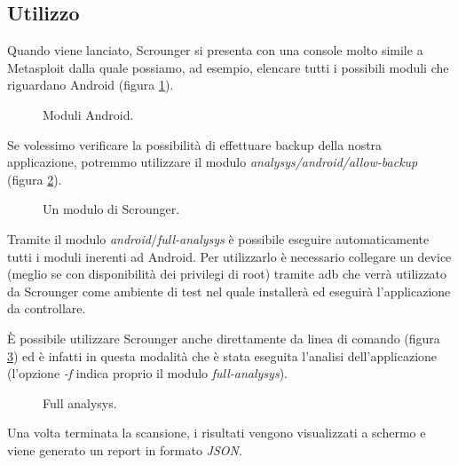 \subsection{Utilizzo}
Quando viene lanciato, Scrounger si presenta con una console molto simile a Metasploit dalla quale possiamo, ad esempio, elencare tutti i possibili moduli che riguardano Android (figura \ref{fig:lista}).
\begin{figure}[h]
	\centering 
	\caption{Moduli Android.}
	\label{fig:lista}
\end{figure}

Se volessimo verificare la possibilità di effettuare backup della nostra applicazione, potremmo utilizzare il modulo \emph{analysys/android/allow-backup} (figura \ref{fig:example}).
\begin{figure}[h]
	\centering 
	\caption{Un modulo di Scrounger.}
	\label{fig:example}
\end{figure}

Tramite il modulo \emph{android$/$full-analysys} è possibile eseguire automaticamente tutti i moduli inerenti ad Android. Per utilizzarlo è necessario collegare un device (meglio se con disponibilità dei privilegi di root) tramite adb che verrà utilizzato da Scrounger come ambiente di test nel quale installerà ed eseguirà l'applicazione da controllare.

È possibile utilizzare Scrounger anche direttamente da linea di comando (figura \ref{fig:start}) ed è infatti in questa modalità che è stata eseguita l'analisi dell'applicazione (l'opzione \emph{-f} indica proprio il modulo \emph{full-analysys}).
\begin{figure}[h]
	\centering 
	\caption{Full analysys.}
	\label{fig:start}
\end{figure}

Una volta terminata la scansione, i risultati vengono visualizzati a schermo e viene generato un report in formato \emph{JSON}.